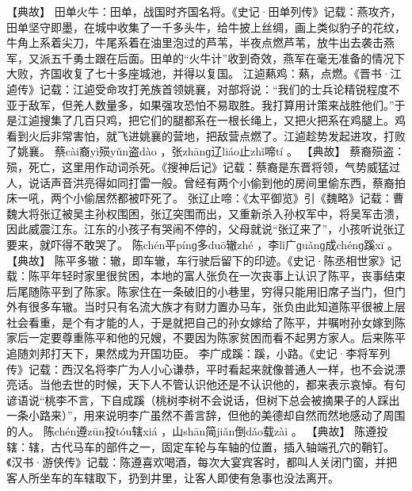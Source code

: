 \documentclass[12pt,UTF8]{ctexbook}
\begin{document}
【典故】
田单火牛：田单，战国时齐国名将。《史记·田单列传》记载：燕攻齐，田单坚守即墨，在城中收集了一千多头牛，给牛披上丝绸，画上类似豹子的花纹，牛角上系着尖刀，牛尾系着在油里泡过的芦苇，半夜点燃芦苇，放牛出去袭击燕军，又派五千勇士跟在后面。田单的“火牛计”收到奇效，燕军在毫无准备的情况下大败，齐国收复了七十多座城池，并得以复国。
江逌爇鸡：爇，点燃。《晋书·江逌传》记载：江逌受命攻打羌族首领姚襄，对部将说：“我们的士兵论精锐程度不亚于敌军，但羌人数量多，如果强攻恐怕不易取胜。我打算用计策来战胜他们。”于是江逌搜集了几百只鸡，把它们的腿都系在一根长绳上，又把火把系在鸡腿上。鸡看到火后非常害怕，就飞进姚襄的营地，把敌营点燃了。江逌趁势发起进攻，打败了姚襄。
蔡cài裔yì殒yǔn盗dào
，张zhānɡ辽liáo止zhǐ啼tí
。
【典故】
蔡裔殒盗：殒，死亡，这里用作动词杀死。《搜神后记》记载：蔡裔是东晋将领，气势威猛过人，说话声音洪亮得如同打雷一般。曾经有两个小偷到他的房间里偷东西，蔡裔拍床一吼，两个小偷居然都被吓死了。
张辽止啼：《太平御览》引《魏略》记载：曹魏大将张辽被吴主孙权围困，张辽突围而出，又重新杀入孙权军中，将吴军击溃，因此威震江东。江东的小孩子有哭闹不停的，父母就说“张辽来了”，小孩听说张辽要来，就吓得不敢哭了。
陈chén平pínɡ多duō辙zhé
，李lǐ广ɡuǎnɡ成chénɡ蹊xī
。
【典故】
陈平多辙：辙，即车辙，车行驶后留下的印迹。《史记·陈丞相世家》记载：陈平年轻时家里很贫困，本地的富人张负在一次丧事上认识了陈平，丧事结束后尾随陈平到了陈家。陈家住在一条破旧的小巷里，穷得只能用旧席子当门，但门外有很多车辙。当时只有名流大族才有财力置办马车，张负由此知道陈平很被上层社会看重，是个有才能的人，于是就把自己的孙女嫁给了陈平，并嘱咐孙女嫁到陈家后一定要尊重陈平和他的兄嫂，不要因为陈家贫困而看不起男方家人。后来陈平追随刘邦打天下，果然成为开国功臣。
李广成蹊：蹊，小路。《史记·李将军列传》记载：西汉名将李广为人小心谦恭，平时看起来就像普通人一样，也不会说漂亮话。当他去世的时候，天下人不管认识他还是不认识他的，都来表示哀悼。有句谚语说“桃李不言，下自成蹊（桃树李树不会说话，但树下总会被摘果子的人踩出一条小路来）”，用来说明李广虽然不善言辞，但他的美德却自然而然地感动了周围的人。
陈chén遵zūn投tóu辖xiá
，山shān简jiǎn倒dǎo载zài
。
【典故】
陈遵投辖：辖，古代马车的部件之一，固定车轮与车轴的位置，插入轴端孔穴的鞘钉。《汉书·游侠传》记载：陈遵喜欢喝酒，每次大宴宾客时，都叫人关闭门窗，并把客人所坐车的车辖取下，扔到井里，让客人即使有急事也没法离开。
\end{document}
